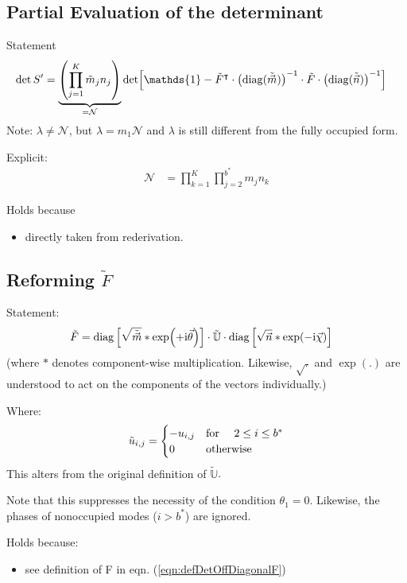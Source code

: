 \documentclass[
	english,
	a4paper,
	fontsize=10pt,
	parskip=half,
	titlepage=true,
	DIV=12,
	final
]{scrreprt}
\newcommand*{\transp}{\ensuremath{^\intercal}}
\newcommand*{\iunit}{\ensuremath{\mathrm{i}}}
\DeclareMathOperator{\diag}{diag}
\begin{document}
\subsection{Partial Evaluation of the determinant}
Statement
\begin{align}
	\det S'
&=
	\underbrace{
		\qty( \prod_{j=1}^{K} \tilde{m}_j n_j )
	}_{= \mathcal{N} }
	\det[
		\mathds{1} -
		\tilde{F}\transp \cdot \qty( \diag(\tilde{\vec{m}}) )^{-1}
		\cdot
		\tilde{F} \cdot \qty( \diag(\tilde{\vec{n}}) )^{-1}
	]
\label{eqn:detSPrimePartial}
\end{align}
Note: $\lambda \neq \mathcal{N}$, but $\lambda = m_1 \mathcal{N}$ {\color{red} and $\lambda$ is still different from the fully occupied form}.

Explicit:
\begin{align}
	\mathcal{N}
&=
	\prod_{k=1}^{K}
	\prod_{j=2}^{b^*}
		m_j n_k
\end{align}

Holds because
\begin{itemize}
\item directly taken from rederivation.
\end{itemize}

\subsection{Reforming $\tilde{F}$}
Statement:
\begin{align}
	\tilde{F}
&=
	\diag\qty[ \sqrt{ \tilde{\vec{m}}} * \exp(+\iunit \vec{\theta}) ]
	\cdot \tilde{\mathbb{U}} \cdot
	\diag\qty[ \sqrt{        \vec{n} } * \exp(-\iunit \vec{\chi  }) ]
\end{align}
(where $*$ denotes component-wise multiplication. Likewise, $\sqrt{.}$ and $\exp(.)$ are understood to act on the components of the vectors individually.)

Where:
\begin{equation}
	\tilde{u}_{i,j} = \begin{cases}
		-u_{i,j}		&\qq*{for } 2 \leq i \leq b^* \\
		0			&\qotherwise*
	\end{cases}
\end{equation}
{\color{red} This alters from the original definition of $\tilde{\mathbb{U}}$}.

Note that this suppresses the necessity of the condition $\theta_1 = 0$. Likewise, the phases of nonoccupied modes ($i > b^*$) are ignored.


Holds because:
\begin{itemize}
\item see definition of F in eqn. (\ref{eqn:defDetOffDiagonalF})
\end{itemize}
\end{document}
